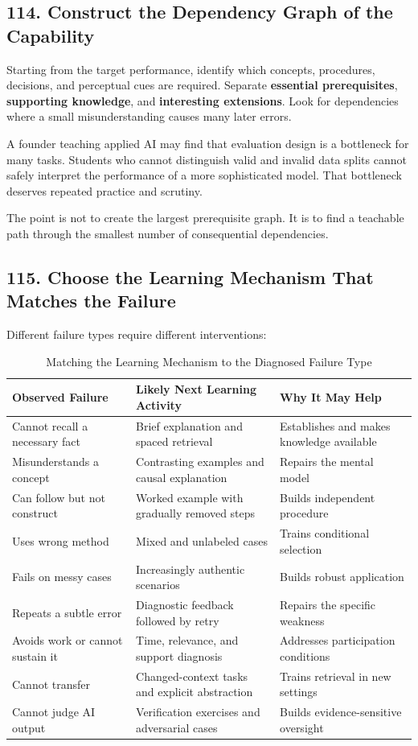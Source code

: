 \subsection*{114. Construct the Dependency Graph of the Capability}

Starting from the target performance, identify which concepts, procedures, decisions, and perceptual cues are required. Separate \textbf{essential prerequisites}, \textbf{supporting knowledge}, and \textbf{interesting extensions}. Look for dependencies where a small misunderstanding causes many later errors.

A founder teaching applied AI may find that evaluation design is a bottleneck for many tasks. Students who cannot distinguish valid and invalid data splits cannot safely interpret the performance of a more sophisticated model. That bottleneck deserves repeated practice and scrutiny.

The point is not to create the largest prerequisite graph. It is to find a teachable path through the smallest number of consequential dependencies.

\subsection*{115. Choose the Learning Mechanism That Matches the Failure}

Different failure types require different interventions:

\begin{table}[t]
\centering
\small
\caption{Matching the Learning Mechanism to the Diagnosed Failure Type}
\begin{tabularx}{\textwidth}{p{}p{}X}
\toprule
\textbf{Observed Failure} & \textbf{Likely Next Learning Activity} & \textbf{Why It May Help} \\
\midrule
Cannot recall a necessary fact & Brief explanation and spaced retrieval & Establishes and makes knowledge available \\
Misunderstands a concept & Contrasting examples and causal explanation & Repairs the mental model \\
Can follow but not construct & Worked example with gradually removed steps & Builds independent procedure \\
Uses wrong method & Mixed and unlabeled cases & Trains conditional selection \\
Fails on messy cases & Increasingly authentic scenarios & Builds robust application \\
Repeats a subtle error & Diagnostic feedback followed by retry & Repairs the specific weakness \\
Avoids work or cannot sustain it & Time, relevance, and support diagnosis & Addresses participation conditions \\
Cannot transfer & Changed-context tasks and explicit abstraction & Trains retrieval in new settings \\
Cannot judge AI output & Verification exercises and adversarial cases & Builds evidence-sensitive oversight \\
\bottomrule
\end{tabularx}
\end{table}

